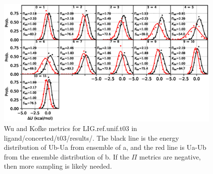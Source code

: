 \documentclass[journal=jctcce,manuscript=article,hyperref=false]{achemso}
\begin{document}
\begin{figure}
\includegraphics[clip,width=6in]{ligand.concerted.t03.results..hist.eps}\vspace{-0.3cm}
                        \caption{Wu and Kofke metrics for LIG.ref.unif.t03 in ligand/concerted/t03/results/. The black line is the energy distribution of Ub-Ua from ensemble of a, and the red line is Ua-Ub from the ensemble distribution of b. If the $\Pi$ metrics are negative, then more sampling is likely needed.}
\end{figure}
\end{document}
